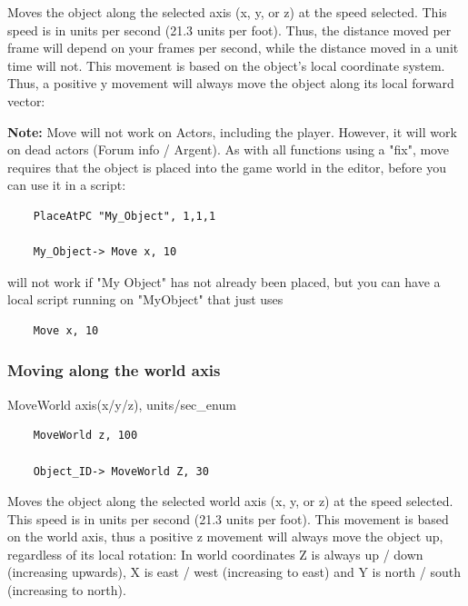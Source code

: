 Moves the object along the selected axis (x, y, or z) at the speed
selected. This speed is in units per second (21.3 units per foot). Thus,
the distance moved per frame will depend on your frames per second,
while the distance moved in a unit time will not. This movement is based
on the object's local coordinate system. Thus, a positive y movement
will always move the object along its local forward vector:


\textbf{Note:} Move will not work on Actors, including the player.
However, it will work on dead actors (Forum info / Argent). As with all
functions using a "fix", move requires that the object is placed into
the game world in the editor, before you can use it in a script:

\begin{lstlisting}
	PlaceAtPC "My_Object", 1,1,1
	
	My_Object-> Move x, 10
\end{lstlisting}

will not work if "My Object" has not already been placed, but you can
have a local script running on "MyObject" that just uses

\begin{lstlisting}
	Move x, 10
\end{lstlisting}

\hypertarget{moving-along-the-world-axis}{%
\subsubsection{Moving along the world
axis}\label{moving-along-the-world-axis}}

	MoveWorld axis(x/y/z), units/sec\_enum

\begin{lstlisting}	
	MoveWorld z, 100
	
	Object_ID-> MoveWorld Z, 30
\end{lstlisting}

Moves the object along the selected world axis (x, y, or z) at the speed
selected. This speed is in units per second (21.3 units per foot). This
movement is based on the world axis, thus a positive z movement will
always move the object up, regardless of its local rotation: In world
coordinates Z is always up / down (increasing upwards), X is east / west
(increasing to east) and Y is north / south (increasing to north).


